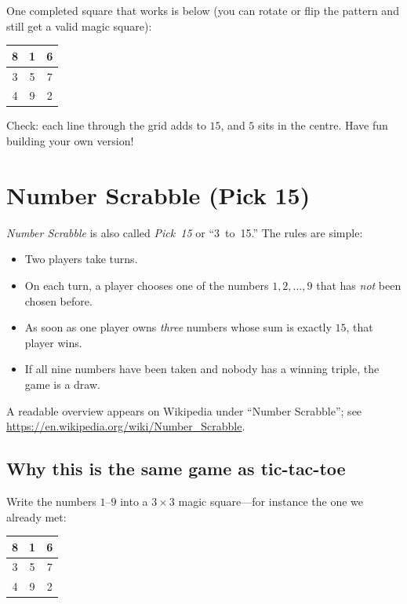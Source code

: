 \noindent
One completed square that works is below (you can rotate or flip the pattern and
still get a valid magic square):

\begin{center}
\begin{tabular}{|c|c|c|}
\hline
8 & 1 & 6 \\
\hline
3 & 5 & 7 \\
\hline
4 & 9 & 2 \\
\hline
\end{tabular}
\end{center}

\noindent
Check: each line through the grid adds to \(15\), and \(5\) sits in the centre.
Have fun building your own version!

\section{Number Scrabble (Pick 15)}
\emph{Number Scrabble} is also called \emph{Pick~15} or ``3~to~15.'' The rules
are simple:

\begin{itemize}
  \item Two players take turns.
  \item On each turn, a player chooses one of the numbers \(1,2,\ldots,9\) that
  has \emph{not} been chosen before.
  \item As soon as one player owns \emph{three} numbers whose sum is exactly
  \(15\), that player wins.
  \item If all nine numbers have been taken and nobody has a winning triple,
  the game is a draw.
\end{itemize}

\noindent
A readable overview appears on Wikipedia under ``Number Scrabble''; see
\url{https://en.wikipedia.org/wiki/Number_Scrabble}.

\subsection*{Why this is the same game as tic-tac-toe}
Write the numbers \(1\)--\(9\) into a \(3\times 3\) magic square---for instance
the one we already met:

\begin{center}
\begin{tabular}{|c|c|c|}
\hline
8 & 1 & 6 \\
\hline
3 & 5 & 7 \\
\hline
4 & 9 & 2 \\
\hline
\end{tabular}
\end{center}

